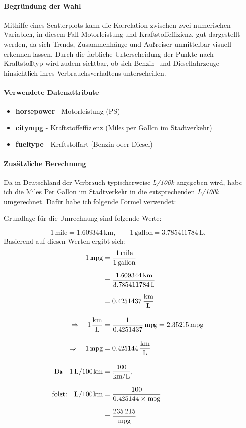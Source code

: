 \documentclass[a4paper,12pt]{article}
\begin{document}
\paragraph{Begründung der Wahl}
Mithilfe eines Scatterplots kann die Korrelation zwischen zwei numerischen Variablen, in diesem Fall Motorleistung und Kraftstoffeffizienz,
gut dargestellt werden, da sich Trends, Zusammenhänge und Außreiser unmittelbar visuell erkennen lassen.
Durch die farbliche Unterscheidung der Punkte nach Kraftstofftyp wird zudem sichtbar, ob sich Benzin- und Dieselfahrzeuge hinsichtlich ihres Verbrauchsverhaltens unterscheiden.


\paragraph{Verwendete Datenattribute}
\begin{itemize}
  \item \textbf{horsepower} - Motorleistung (PS)
  \item \textbf{citympg} - Kraftstoffeffizienz (Miles per Gallon im Stadtverkehr)
  \item \textbf{fueltype} - Kraftstoffart (Benzin oder Diesel)
\end{itemize}


\paragraph{Zusätzliche Berechnung} \break
Da in Deutschland der Verbrauch typischerweise \textit{L/100k} angegeben wird, habe ich die Miles Per Gallon im Stadtverkehr in die entsprechenden \textit{L/100k} umgerechnet.
Dafür habe ich folgende Formel verwendet: \break

Grundlage für die Umrechnung sind folgende Werte: \break

\[
1\,\text{mile} = 1.609344\,\text{km}, 
\qquad 
1\,\text{gallon} = 3.785411784\,\text{L}.
\]
Basierend auf diesen Werten ergibt sich:
\[
\begin{aligned}
1\,\text{mpg} 
&= \frac{1\,\text{mile}}{1\,\text{gallon}} \\[6pt]
&= \frac{1.609344\,\text{km}}{3.785411784\,\text{L}} \\[6pt]
&= 0.4251437\,\frac{\text{km}}{\text{L}} \\[10pt]
\Rightarrow \quad
1\,\frac{\text{km}}{\text{L}} 
&= \frac{1}{0.4251437}\,\text{mpg} 
= 2.35215\,\text{mpg} \\[10pt]
\Rightarrow \quad
1\,\text{mpg} 
&= 0.425144\,\frac{\text{km}}{\text{L}} \\[10pt]
\text{Da} \quad
1\,\text{L}/100\,\text{km} 
&= \frac{100}{\text{km}/\text{L}}, \\[6pt]
\text{folgt:} \quad
\text{L/100\,km} 
&= \frac{100}{0.425144 \times \text{mpg}} \\[6pt]
&= \frac{235.215}{\text{mpg}}
\end{aligned}
\]
\end{document}
